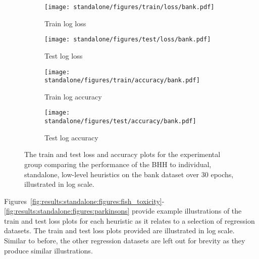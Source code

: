 \begin{figure}[htpb]
	\begin{subfigure}{0.5\textwidth}
		\centering
		\texttt{[image: standalone/figures/train/loss/bank.pdf]}
		\caption{Train log loss}
		\label{fig:results:standalone:figures:loss:train:bank}
	\end{subfigure}
	\begin{subfigure}{0.5\textwidth}
		\centering
		\texttt{[image: standalone/figures/test/loss/bank.pdf]}
		\caption{Test log loss}
		\label{fig:results:standalone:figures:loss:test:bank}
	\end{subfigure}
	\par\bigskip
	\par\bigskip
	\begin{subfigure}{0.5\textwidth}
		\centering
		\texttt{[image: standalone/figures/train/accuracy/bank.pdf]}
		\caption{Train log accuracy}
		\label{fig:results:standalone:figures:accuracy:train:bank}
	\end{subfigure}
	\begin{subfigure}{0.5\textwidth}
		\centering
		\texttt{[image: standalone/figures/test/accuracy/bank.pdf]}
		\caption{Test log accuracy}
		\label{fig:results:standalone:figures:accuracy:test:bank}
	\end{subfigure}
	\par\bigskip
	\caption{The train and test loss and accuracy plots for the experimental group comparing the performance of the \acs{BHH} to individual, standalone, low-level heuristics on the bank dataset over 30 epochs, illustrated in log scale.}
	\label{fig:results:standalone:figures:bank}
\end{figure}

Figures~\ref{fig:results:standalone:figures:fish_toxicity}-\ref{fig:results:standalone:figures:parkinsons} provide example illustrations of the train and test loss plots for each heuristic as it relates to a selection of regression datasets. The train and test loss plots provided are illustrated in log scale. Similar to before, the other regression datasets are left out for brevity as they produce similar illustrations.

